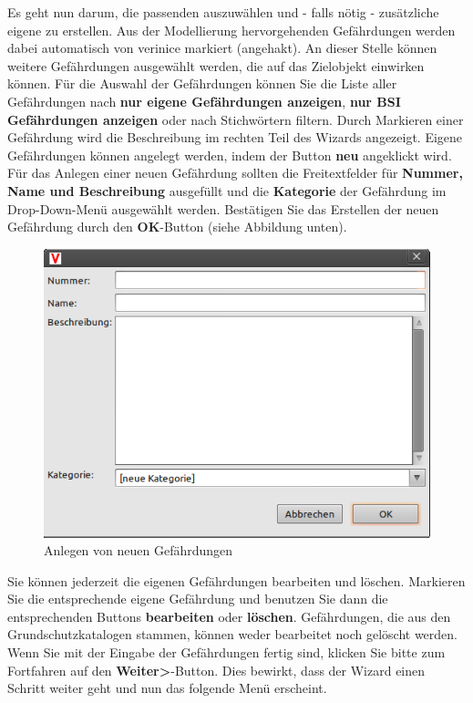 \documentclass[a4paper,10pt]{book}
\begin{document}
Es geht nun darum, die passenden auszuwählen und - falls nötig - zusätzliche eigene zu erstellen. Aus der Modellierung hervorgehenden Gefährdungen werden dabei automatisch von verinice markiert (angehakt). An dieser Stelle können weitere Gefährdungen ausgewählt werden, die auf das Zielobjekt einwirken können. Für die Auswahl der Gefährdungen können Sie die Liste aller Gefährdungen nach \textbf{nur eigene Gefährdungen anzeigen}, \textbf{nur BSI Gefährdungen anzeigen} oder nach Stichwörtern filtern.
Durch Markieren einer Gefährdung wird die Beschreibung im rechten Teil des Wizards angezeigt.
Eigene Gefährdungen können angelegt werden, indem der Button \textbf{neu} angeklickt wird. Für das Anlegen einer neuen Gefährdung sollten die Freitextfelder für \textbf{Nummer, Name und Beschreibung} ausgefüllt und die \textbf{Kategorie} der Gefährdung im Drop-Down-Menü ausgewählt werden. Bestätigen Sie das Erstellen der neuen Gefährdung durch den \textbf{OK}-Button (siehe Abbildung unten).
\newline
\begin{figure}[htb!]
  \centering
  \includegraphics[width=\textwidth]{Screenshot/Anlegen_von_neuen_Gefaehrdungen.jpg}
  \caption{\label{Anlegen von neuen Gefaehrdungen} Anlegen von neuen Gefährdungen}
\end{figure}
\newline
Sie können jederzeit die eigenen Gefährdungen bearbeiten und löschen. Markieren Sie die entsprechende eigene Gefährdung und benutzen Sie dann die entsprechenden Buttons \textbf{bearbeiten} oder \textbf{löschen}. Gefährdungen, die aus den Grundschutzkatalogen stammen, können weder bearbeitet noch gelöscht werden. Wenn Sie mit der Eingabe der Gefährdungen fertig sind, klicken Sie bitte zum Fortfahren auf den \textbf{Weiter\textgreater}-Button. Dies bewirkt, dass der Wizard einen Schritt weiter geht und nun das folgende Menü erscheint.
\end{document}
